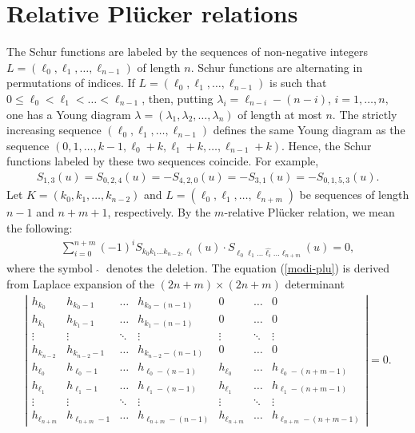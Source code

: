 \documentclass[10pt,a4paper]{amsart}
\numberwithin{equation}{section}
\begin{document}
\section{Relative Pl\"ucker relations}\label{section2}
The Schur functions are labeled by the sequences of non-negative integers $L=(\ell_0,\ell_1,\dots,\ell_{n-1})$ of length $n$. Schur functions are alternating in permutations of indices. If $L=(\ell_0,\ell_1,\dots,\ell_{n-1})$ is such that $0\leq\ell_{0}<\ell_{1} <\dots<\ell_{n-1}$, then, putting $\lambda_{i}=\ell_{n-i}-(n-i)$, $i = 1,\dots,n,$ one has a Young diagram $\lambda=(\lambda_1,\lambda_2,\dots,\lambda_{n})$ of length at most $n$. The strictly increasing sequence $(\ell_0,\ell_1,\dots,\ell_{n-1})$ defines the same Young diagram as the sequence $(0,1,\dots,k-1,\allowbreak{\ell_{0}+k}, {\ell_{1}+k},\dots,\ell_{n-1}+k)$. Hence, the Schur functions labeled by these two sequences coincide. For example,
\begin{gather*}
S_{1,3}(u)=S_{0,2,4}(u)=-S_{4,2,0}(u)=-S_{3,1}(u)=-S_{0,1,5,3}(u).
\end{gather*}
Let $K=(k_0,k_1,\dots,k_{n-2})$ and $L=(\ell_{0},\ell_{1},\dots,\ell_{n+m})$ be sequences of length
$n-1$ and $n+m+1$, respectively. By the $m$-relative Pl\"ucker relation, we mean the following:
\begin{gather}
\sum_{i=0}^{n+m}{(-1)}^{i}S_{k_0k_1\dots k_{n-2},\ell_i}(u)\cdot S_{\ell_0\ell_1\dots\widehat{\ell_i}\dots\ell_{n+m}}(u)=0, \label{modi-plu}
\end{gather}
where the symbol \,$\widehat{\ }$\, denotes the deletion. The equation (\ref{modi-plu}) is derived from Laplace expansion of the
$(2n+m) \times (2n+m)$ determinant
\begin{align*}%
\left|\begin{array}{cccc|ccc}
h_{k_0} & h_{k_{0}-1} & \hdots & h_{k_{0}-(n-1)} & 0 & \hdots & 0 \\
h_{k_1} & h_{k_{1}-1} & \hdots & h_{k_{1}-(n-1)} & 0 & \hdots & 0 \\
\vdots & \vdots & \ddots & \vdots & \vdots & \ddots & \vdots \\
h_{k_{n-2}} & h_{k_{n-2}-1} & \hdots & h_{k_{n-2}-(n-1)} & 0 &\hdots & 0 \\
h_{\ell_0} & h_{\ell_{0}-1} & \hdots & h_{\ell_{0}-(n-1)} & h_{\ell_{0}} & \hdots & h_{\ell_{0}-(n+m-1)} \\[1mm]\hline
h_{\ell_1} & h_{\ell_{1}-1} & \hdots & h_{\ell_{1}-(n-1)} & h_{\ell_{1}} & \hdots & h_{\ell_{1}-(n+m-1)} \\
\vdots & \vdots & \ddots & \vdots & \vdots & \ddots & \vdots \\
h_{\ell_{n+m}} & h_{\ell_{n+m}-1} & \hdots & h_{\ell_{n+m}-(n-1)} & h_{\ell_{n+m}} & \hdots & h_{\ell_{n+m}-(n+m-1)}
\end{array}\right|
=0.
\end{align*}
\end{document}
